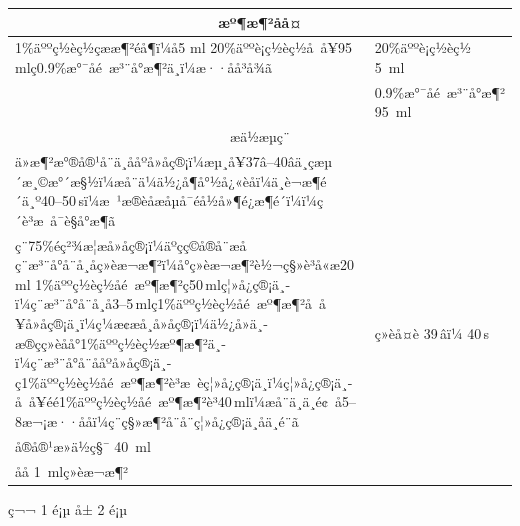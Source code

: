 \documentclass[UTF8,10pt,a4paper,fontset=fandol]{ctexart}
\newcommand{\fieldvalue}[1]{#1}
\newcommand{\handwritten}[1]{#1}
\begin{document}
\begin{center}
\begin{center}
\begin{tabularx}{\textwidth}{|p{}|X|}
\hline
\multicolumn{2}{|c|}{æº¶æ¶²åå¤}\\
\hline
1\%äººç½èç½çææ¶²éå¶ï¼å5 ml 20\%äººè¡ç½èç½å å¥95 mlç0.9\%æ°¯åé æ³¨å°æ¶²ä¸­ï¼æ··åå³å¾ã &
20\%äººè¡ç½èç½\quad
\fieldvalue{\handwritten{5}}\ ml\\
& 0.9\%æ°¯åé æ³¨å°æ¶²\quad
\fieldvalue{\handwritten{95}}\ ml\\
\hline
\multicolumn{2}{|c|}{æä½æµç¨}\\
\hline
ä»æ¶²æ°®å®¹å¨ä¸­ååºå»å­ç®¡ï¼æµ¸å¥37â--40âä¸­ç­æµ´æ¸©æ°´æ§½ï¼æå¨ä¼ä½¿å¶å°½å¿«èåï¼ä¸è¬æ¶é´ä¸º40--50\,sï¼æ ¹æ®èåæåµå¯éå½å»¶é¿æ¶é´ï¼ï¼ç´è³æ å¯è§å°æ¶ã\\
ç¨75\%éç²¾æ¦æ­å»å­ç®¡ï¼äºçç©å®å¨æåç¨æ³¨å°å¨å¸åç»èæ¬æ¶²ï¼å°ç»èæ¬æ¶²è½¬ç§»è³å«æ20\,ml 1\%äººç½èç½åé æº¶æ¶²ç50\,mlç¦»å¿ç®¡ä¸­ï¼ç¨æ³¨å°å¨å¸å3--5\,mlç1\%äººç½èç½åé æº¶æ¶²å å¥å»å­ç®¡ä¸­ï¼ç¼æ¢æå¸å»å­ç®¡ï¼ä½¿å»ä¸­æ®çç»èåå°1\%äººç½èç½æº¶æ¶²ä¸­ï¼ç¨æ³¨å°å¨ååºå»å­ç®¡ä¸­ç1\%äººç½èç½åé æº¶æ¶²è³æ èç¦»å¿ç®¡ä¸­ï¼ç¦»å¿ç®¡ä¸­å å¥éé1\%äººç½èç½åé æº¶æ¶²è³40\,mlï¼æå¨ä¸ä¸é¢ å5--8æ¬¡æ··ååï¼ç¨ç§»æ¶²å¨å¨ç¦»å¿ç®¡ä¸­åä¸é¨ã &
ç»èå¤è
\fieldvalue{\handwritten{39}}\,âï¼
\fieldvalue{\handwritten{40}}\,s\\[4pt]
å®å®¹æ»ä½ç§¯
\fieldvalue{\handwritten{40}}\ ml\\[4pt]
åå
\fieldvalue{\handwritten{1}}\ mlç»èæ¬æ¶²\\
\hline
\end{tabularx}

\begin{center}
ç¬¬ 1 é¡µ å± 2 é¡µ
\end{center}

\newpage


\end{center}
\end{center}
\end{document}

